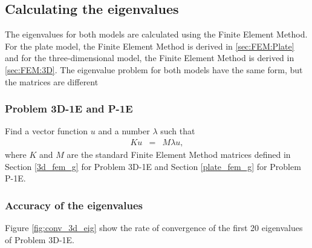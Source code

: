 \documentclass[../../main.tex]{subfiles}
\begin{document}
\begin{figure}[h!]
{{\begin{minipage}[b]{0.8\linewidth}
				
			\end{minipage}
		}
	}
\end{figure}
\FloatBarrier

\subsection{Calculating the eigenvalues}
The eigenvalues for both models are calculated using the Finite Element Method. For the plate model, the Finite Element Method is derived in \ref{sec:FEM:Plate} and for the three-dimensional model, the Finite Element Method is derived in \ref{sec:FEM:3D}. The eigenvalue problem for both models have the same form, but the matrices are different

\subsubsection{Problem 3D-1E and P-1E}
Find a vector function $u$ and a number $\lambda$ such that
\begin{eqnarray}
	K{u} & = & M\lambda{u}, 
\end{eqnarray} where $K$ and $M$ are the standard Finite Element Method matrices defined in Section \ref{3d_fem_g} for Problem 3D-1E and Section \ref{plate_fem_g} for Problem P-1E.

\subsubsection{Accuracy of the eigenvalues}
Figure \ref{fig:conv_3d_eig} show the rate of convergence of the first 20 eigenvalues of Problem 3D-1E. 
\end{document}
